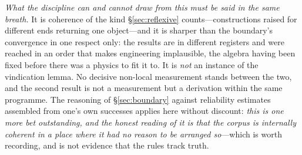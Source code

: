 \documentclass[11pt,a4paper]{article}
\begin{document}
\emph{What the discipline can and cannot draw from this must be said in the same breath.} It is coherence of
the kind \S\ref{sec:reflexive} counts---constructions raised for different ends returning one object---and it is
sharper than the boundary's convergence in one respect only: the results are in different registers and were
reached in an order that makes engineering implausible, the algebra having been fixed before there was a physics
to fit it to. It is \emph{not} an instance of the vindication lemma. No decisive non-local measurement stands
between the two, and the second result is not a measurement but a derivation within the same programme. The
reasoning of \S\ref{sec:boundary} against reliability estimates assembled from one's own successes applies here
without discount: \emph{this is one more bet outstanding, and the honest reading of it is that the corpus is
internally coherent in a place where it had no reason to be arranged so}---which is worth recording, and is not
evidence that the rules track truth.
\end{document}
